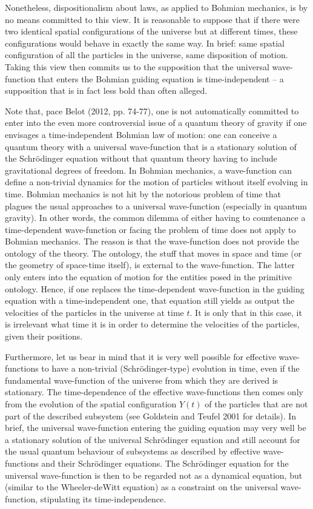 \documentclass[12pt]{article}
\theoremstyle{definition}
\begin{document}
Nonetheless, dispositionalism about laws, as applied to Bohmian mechanics, is by no means committed to this view. It is reasonable to suppose that if there were two identical spatial configurations of the universe but at different times, these configurations would behave in exactly the same way. In brief: same spatial configuration of all the particles in the universe, same disposition of motion. Taking this view then commits us to the supposition that the universal wave-function that enters the Bohmian guiding equation is time-independent -- a supposition that is in fact less bold than often alleged.

Note that, pace Belot (2012, pp. 74-77), one is not automatically committed to enter into the even more controversial issue of a quantum theory of gravity if one envisages a time-independent Bohmian law of motion: one can conceive a quantum theory with a universal wave-function that is a stationary solution of the Schr\"odinger equation without that quantum theory having to include gravitational degrees of freedom. In Bohmian mechanics, a wave-function can define a non-trivial dynamics for the motion of particles without itself evolving in time. Bohmian mechanics is not hit by the notorious problem of time that plagues the usual approaches to a universal wave-function (especially in quantum gravity). In other words, the common dilemma of either having to countenance a time-dependent wave-function or facing the problem of time does not apply to Bohmian mechanics. The reason is that the wave-function does not provide the ontology of the theory. The ontology, the stuff that moves in space and time (or the geometry of space-time itself), is external to the wave-function. The latter only enters into the equation of motion for the entities posed in the primitive ontology. Hence, if one replaces the time-dependent wave-function in the guiding equation with a time-independent one, that equation still yields as output the velocities of the particles in the universe at time $t$. It is only that in this case, it is irrelevant what time it is in order to determine the velocities of the particles, given their positions.

Furthermore, let us bear in mind that it is very well possible for effective wave-functions to have a non-trivial (Schr\"odinger-type) evolution in time, even if the fundamental wave-function of the universe from which they are derived is stationary. The time-dependence of the effective wave-functions then comes only from the evolution of the spatial configuration $Y(t)$ of the particles that are not part of the described subsystem (see Goldstein and Teufel 2001 for details). In brief, the universal wave-function entering the guiding equation may very well be a stationary solution of the universal Schr\"odinger equation and still account for the usual quantum behaviour of subsystems as described by effective wave-functions and their Schr\"odinger equations. The Schr\"odinger equation for the universal wave-function is then to be regarded not as a dynamical equation, but (similar to the Wheeler-deWitt equation) as a constraint on the universal wave-function, stipulating its time-independence.
\end{document}
